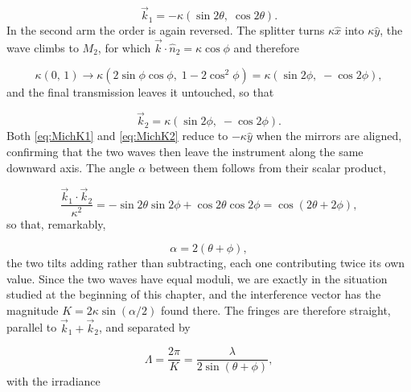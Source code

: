         \begin{equation}\label{eq:MichK1}
            \vec{k}_1 = -\kappa\left(\sin 2\theta,\;\cos 2\theta\right).
        \end{equation}
        In the second arm the order is again reversed. The splitter turns $\kappa\hat{x}$ into $\kappa\hat{y}$, the wave climbs to $M_2$, for which $\vec{k}\cdot\hat{n}_2 = \kappa\cos\phi$ and therefore

        \begin{equation*}
            \kappa\left(0,\,1\right) \longrightarrow \kappa\left(2\sin\phi\cos\phi,\;1-2\cos^{2}\phi\right) = \kappa\left(\sin 2\phi,\;-\cos 2\phi\right),
        \end{equation*}
        and the final transmission leaves it untouched, so that

        \begin{equation}\label{eq:MichK2}
            \vec{k}_2 = \kappa\left(\sin 2\phi,\;-\cos 2\phi\right).
        \end{equation}
        Both \ref{eq:MichK1} and \ref{eq:MichK2} reduce to $-\kappa\hat{y}$ when the mirrors are aligned, confirming that the two waves then leave the instrument along the same downward axis. The angle $\alpha$ between them follows from their scalar product,

        \begin{equation*}
            \frac{\vec{k}_1\cdot\vec{k}_2}{\kappa^{2}} = -\sin 2\theta\sin 2\phi + \cos 2\theta\cos 2\phi = \cos\left(2\theta+2\phi\right),
        \end{equation*}
        so that, remarkably,

        \begin{equation}\label{eq:MichAlpha}
            \alpha = 2\left(\theta+\phi\right),
        \end{equation}
        the two tilts adding rather than subtracting, each one contributing twice its own value. Since the two waves have equal moduli, we are exactly in the situation studied at the beginning of this chapter, and the interference vector has the magnitude $K = 2\kappa\sin(\alpha/2)$ found there. The fringes are therefore straight, parallel to $\vec{k}_1+\vec{k}_2$, and separated by

        \begin{equation}\label{eq:MichLambdaPlane}
            \Lambda = \frac{2\pi}{K} = \frac{\lambda}{2\sin\left(\theta+\phi\right)},
        \end{equation}
        with the irradiance

